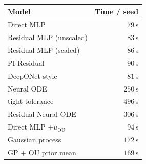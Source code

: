 \begin{tabular}{lr}
\toprule
Model & Time / seed \\
\midrule
Direct MLP & $79$\,s \\
Residual MLP (unscaled) & $83$\,s \\
Residual MLP (scaled) & $86$\,s \\
PI-Residual & $90$\,s \\
DeepONet-style & $81$\,s \\
Neural ODE & $250$\,s \\
\quad tight tolerance & $496$\,s \\
Residual Neural ODE & $306$\,s \\
Direct MLP $+u_{\mathrm{OU}}$ & $94$\,s \\
Gaussian process & $172$\,s \\
GP $+$ OU prior mean & $169$\,s \\
\bottomrule
\end{tabular}
